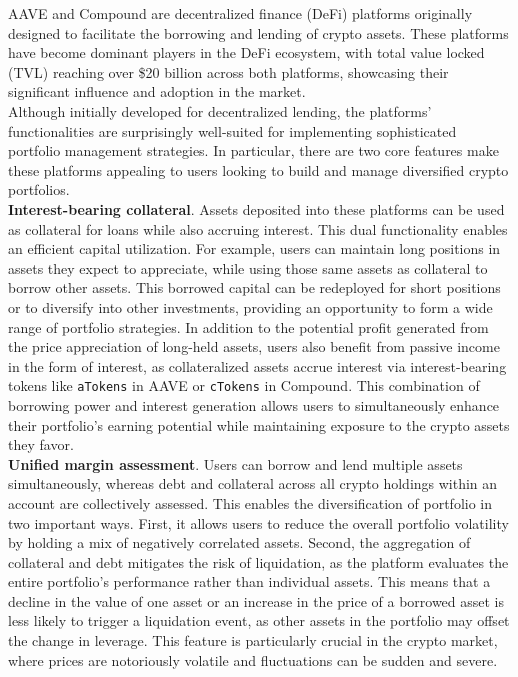 \documentclass{article} %
\theoremstyle{plain}
\theoremstyle{definition} %
\begin{document}
AAVE and Compound are decentralized finance (DeFi) platforms originally designed to facilitate the borrowing and lending of crypto assets. 
 These platforms have become dominant players in the DeFi ecosystem, with total value locked (TVL) reaching over \$20 billion across both platforms, showcasing their significant influence and adoption in the market. \\

Although initially developed for decentralized lending, the platforms' functionalities are surprisingly well-suited for implementing sophisticated portfolio management strategies.
 In particular, there are two core features make these platforms appealing to users looking to build and manage diversified crypto portfolios.\\

{\bf Interest-bearing collateral}. 
 Assets deposited into these platforms can be used as collateral for loans while also accruing interest. 
 This dual functionality enables an efficient capital utilization. 
 For example, users can maintain long positions in assets they expect to appreciate, while using those same assets as collateral to borrow other assets.
 This borrowed capital can be redeployed for short positions or to diversify into other investments, providing an opportunity to form a wide range of portfolio strategies. 
 In addition to the potential profit generated from the price appreciation of long-held assets, users also benefit from passive income in the form of interest,
 as collateralized assets accrue interest via interest-bearing tokens like \texttt{aTokens} in AAVE or \texttt{cTokens} in Compound.
 This combination of borrowing power and interest generation allows users to simultaneously enhance their portfolio's earning potential while maintaining exposure to the crypto assets they favor. \\

{\bf Unified margin assessment}.
Users can borrow and lend multiple assets simultaneously, whereas debt and collateral across all crypto holdings within an account are collectively assessed. 
 This enables the diversification of portfolio in two important ways. 
 First, it allows users to reduce the overall portfolio volatility by holding a mix of negatively correlated assets.
 Second, the aggregation of collateral and debt mitigates the risk of liquidation, 
 as the platform evaluates the entire portfolio's performance rather than individual assets.
 This means that a decline in the value of one asset or an increase in the price of a borrowed asset is less likely to trigger a liquidation event,
 as other assets in the portfolio may offset the change in leverage. 
 This feature is particularly crucial in the crypto market, where prices are notoriously volatile and fluctuations can be sudden and severe. \\ 
\end{document}
